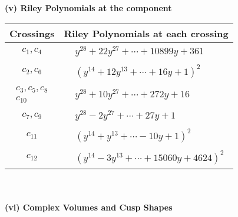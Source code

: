 \documentclass[1p]{elsarticle_modified}
\theoremstyle{definition}
\begin{document}
\newpage\renewcommand{\arraystretch}{1}
\flushleft \textbf{(v) Riley Polynomials at the component}\newline \\
\begin{tabular}{m{50pt}|m{274pt}}
Crossings & \hspace{64pt}Riley Polynomials at each crossing \\
\hline $$\begin{aligned}c_{1},c_{4}\end{aligned}$$&$\begin{aligned}
&y^{28}+22 y^{27}+\cdots+10899 y+361
\end{aligned}$\\
\hline $$\begin{aligned}c_{2},c_{6}\end{aligned}$$&$\begin{aligned}
&(y^{14}+12 y^{13}+\cdots+16 y+1)^{2}
\end{aligned}$\\
\hline $$\begin{aligned}c_{3},c_{5},c_{8}\\c_{10}\end{aligned}$$&$\begin{aligned}
&y^{28}+10 y^{27}+\cdots+272 y+16
\end{aligned}$\\
\hline $$\begin{aligned}c_{7},c_{9}\end{aligned}$$&$\begin{aligned}
&y^{28}-2 y^{27}+\cdots+27 y+1
\end{aligned}$\\
\hline $$\begin{aligned}c_{11}\end{aligned}$$&$\begin{aligned}
&(y^{14}+y^{13}+\cdots-10 y+1)^{2}
\end{aligned}$\\
\hline $$\begin{aligned}c_{12}\end{aligned}$$&$\begin{aligned}
&(y^{14}-3 y^{13}+\cdots+15060 y+4624)^{2}
\end{aligned}$\\
\hline
\end{tabular}\\~\\
\newpage\flushleft \textbf{(vi) Complex Volumes and Cusp Shapes}
\end{document}
